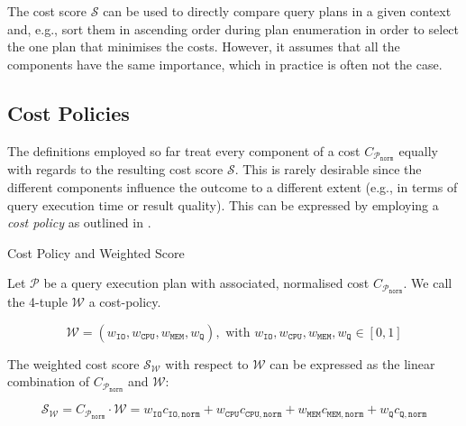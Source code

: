 The cost score $\mathcal{S}$ can be used to directly compare query plans in a given context and, e.g., sort them in ascending order during plan enumeration in order to select the one plan that minimises the costs. However, it assumes that all the components have the same importance, which in practice is often not the case.

\subsection{Cost Policies}

The definitions employed so far treat every component of a cost $C_{\mathcal{P}_{\mathtt{norm}}}$ equally with regards to the resulting cost score $\mathcal{S}$. This is rarely desirable since the different components influence the outcome to a different extent (e.g., in terms of query execution time or result quality). This can be expressed by employing a \emph{cost policy} as outlined in .

\begin{definition}[label=definition:cost_policy]{Cost Policy and Weighted Score}{}

    Let $\mathcal{P}$  be a query execution plan with associated, normalised cost $C_{\mathcal{P}_{\mathtt{norm}}}$. We call the 4-tuple $\mathcal{W}$ a cost-policy.

    \begin{equation*}
        \mathcal{W} = (w_{\mathtt{IO}}, w_{\mathtt{CPU}}, w_{\mathtt{MEM}}, w_{\mathtt{Q}}), \text{ with } w_{\mathtt{IO}},  w_{\mathtt{CPU}}, w_{\mathtt{MEM}}, w_{\mathtt{Q}} \in [0, 1]
    \end{equation*}

   The weighted cost score $\mathcal{S}_{\mathcal{W}}$ with respect to $\mathcal{W}$ can be expressed as the linear combination of $C_{\mathcal{P}_{\mathtt{norm}}}$ and $\mathcal{W}$:

    \begin{equation*}
        \mathcal{S}_{\mathcal{W}} = C_{\mathcal{P}_{\mathtt{norm}}} \cdot \mathcal{W} = w_{\mathtt{IO}}c_{\mathtt{IO},\mathtt{norm}} + w_{\mathtt{CPU}} c_{\mathtt{CPU},\mathtt{norm}} + w_{\mathtt{MEM}} c_{\mathtt{MEM},\mathtt{norm}} + w_{\mathtt{Q}} c_{\mathtt{Q},\mathtt{norm}}
    \end{equation*}
\end{definition}

